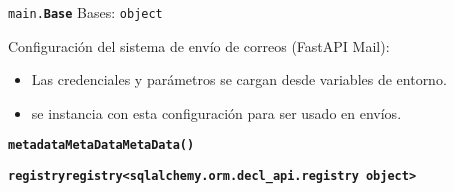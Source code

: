 \documentclass[a4paper,11pt,spanish]{sphinxmanual}
\newcommand{\robotoMonoBold}{\fontseries{b}\selectfont\ttfamily}
\renewcommand{\sphinxcode}[1]{\textcolor{sphinxorangeCode}{{\robotoMonoBold #1}}}
\renewcommand{\sphinxbfcode}[1]{\textbf{\sphinxcode{#1}}}
\renewcommand{\sphinxupquote}[1]{\texttt{#1}}
\begin{document}
\begin{fulllineitems}
\label{\detokenize{modelos:main.Base}}
\pysigstartsignatures
\pysiglinewithargsret
{\sphinxbfcode{\sphinxupquote{}}\sphinxcode{\sphinxupquote{main.}}\sphinxbfcode{\sphinxupquote{Base}}}
{}
{}
\pysigstopsignatures
\sphinxAtStartPar
Bases: \sphinxcode{\sphinxupquote{object}}

\sphinxAtStartPar
Configuración del sistema de envío de correos (FastAPI Mail):
\begin{itemize}
\item {} 
\sphinxAtStartPar
Las credenciales y parámetros se cargan desde variables de entorno.

\item {} 
\sphinxAtStartPar
{} se instancia con esta configuración para ser usado en envíos.

\end{itemize}

\begin{fulllineitems}
\label{\detokenize{modelos:main.Base.metadata}}
\pysigstartsignatures
\pysigline
{\sphinxbfcode{\sphinxupquote{metadata}}\sphinxbfcode{\sphinxupquote{MetaData}}\sphinxbfcode{\sphinxupquote{\DUrole{w}{ }\DUrole{w}{ }MetaData()}}}
\pysigstopsignatures
\end{fulllineitems}


\begin{fulllineitems}
\label{\detokenize{modelos:main.Base.registry}}
\pysigstartsignatures
\pysigline
{\sphinxbfcode{\sphinxupquote{registry}}\sphinxbfcode{\sphinxupquote{registry}}\sphinxbfcode{\sphinxupquote{\DUrole{w}{ }\DUrole{w}{ }\textless{}sqlalchemy.orm.decl\_api.registry object\textgreater{}}}}
\pysigstopsignatures
\end{fulllineitems}


\end{fulllineitems}

\end{document}

